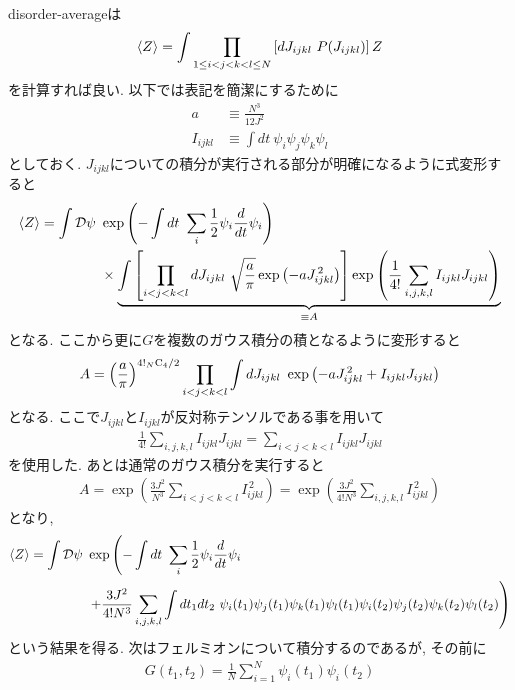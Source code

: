 	disorder-averageは
	\begin{align}
	\langle Z \rangle = \int \prod_{1\leq i<j<k<l \leq N}\left[dJ_{ijkl}\ P(J_{ijkl})\right]Z
	\end{align}
	を計算すれば良い. 
	以下では表記を簡潔にするために
	\begin{align}
	a &\equiv \frac{N^3}{12J^2}\\
	I_{ijkl} &\equiv \int dt\ \psi_i\psi_j\psi_k\psi_l
	\end{align}
	としておく. 
	$J_{ijkl}$についての積分が実行される部分が明確になるように式変形すると
	\begin{align}
	\langle Z \rangle =
		\int \mathcal{D}\psi \  &\exp\left(- \int dt\ \sum_i \frac{1}{2}\psi_i\frac{d}{dt}\psi_i\right)
		\nonumber\\
		&\times \underbrace{\int \left[\prod_{i<j<k<l}
			dJ_{ijkl}\ \sqrt{\frac{a}{\pi}} \exp\left(-aJ_{ijkl}^{\, 2}\right)
			\right]
			\exp\left(\frac{1}{4!}\sum_{i,j,k,l}I_{ijkl}J_{ijkl}\right)}_{\equiv A}
	\end{align}
	となる. ここから更に$G$を複数のガウス積分の積となるように変形すると
	\begin{align}
	A = \left(\frac{a}{\pi}\right)^{4!{}_{N} \mathrm{C}_{4} / 2}
		\prod_{i<j<k<l}\int dJ_{ijkl}\ \exp\left(
		-aJ_{ijkl}^{\, 2} + I_{ijkl}J_{ijkl}
		\right)
	\end{align}
	となる. 
	ここで$J_{ijkl}$と$I_{ijkl}$が反対称テンソルである事を用いて
	\begin{align}
	\frac{1}{4!}\sum_{i,j,k,l}I_{ijkl}J_{ijkl} = \sum_{i<j<k<l}I_{ijkl}J_{ijkl}
	\end{align}
	を使用した. 
	あとは通常のガウス積分を実行すると
	\begin{align}
	A = \exp\left(\frac{3J^2}{N^3}\sum_{i<j<k<l}I_{ijkl}^{\, 2}\right)
	  = \exp\left(\frac{3J^2}{4!N^3}\sum_{i,j,k,l}I_{ijkl}^{\, 2}\right)
	\end{align}
	となり, 
	\begin{align}
	\langle Z \rangle = \int \mathcal{D}\psi \  &\exp\left(
	- \int dt\ \sum_i \frac{1}{2}\psi_i\frac{d}{dt}\psi_i \right. \nonumber\\
	&\left.
	+ \frac{3J^2}{4!N^3}\sum_{i,j,k,l}\int dt_1dt_2\
		\psi_i(t_1)\psi_j(t_1)\psi_k(t_1)\psi_l(t_1)
		\psi_i(t_2)\psi_j(t_2)\psi_k(t_2)\psi_l(t_2)
	\right)
	\end{align}
	という結果を得る. 
	次はフェルミオンについて積分するのであるが, その前に
	\begin{align}
	G(t_1, t_2) = \frac{1}{N}\sum_{i = 1}^{N}\psi_i(t_1)\psi_i(t_2)
	\end{align}
